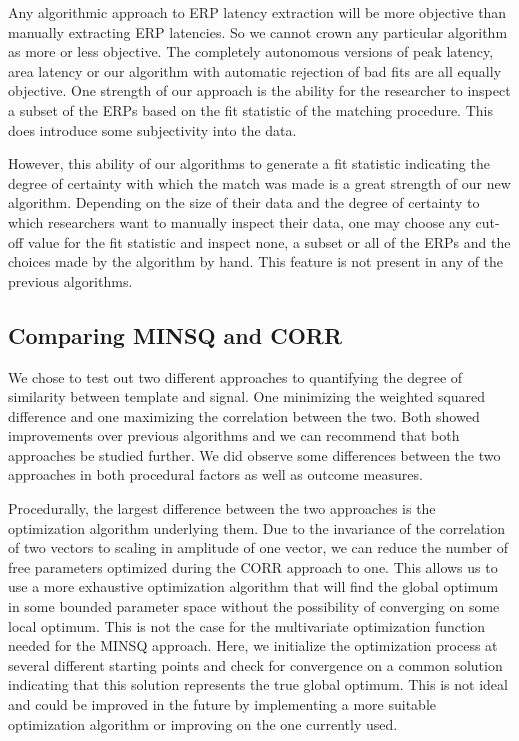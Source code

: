 \documentclass[
  man]{apa7}
\begin{document}
Any algorithmic approach to ERP latency extraction will be more objective than manually extracting ERP latencies. So we cannot crown any particular algorithm as more or less objective. The completely autonomous versions of peak latency, area latency or our algorithm with automatic rejection of bad fits are all equally objective. One strength of our approach is the ability for the researcher to inspect a subset of the ERPs based on the fit statistic of the matching procedure. This does introduce some subjectivity into the data.

However, this ability of our algorithms to generate a fit statistic indicating the degree of certainty with which the match was made is a great strength of our new algorithm. Depending on the size of their data and the degree of certainty to which researchers want to manually inspect their data, one may choose any cut-off value for the fit statistic and inspect none, a subset or all of the ERPs and the choices made by the algorithm by hand. This feature is not present in any of the previous algorithms.

\hypertarget{comparing-minsq-and-corr}{%
\subsection{Comparing MINSQ and CORR}\label{comparing-minsq-and-corr}}

We chose to test out two different approaches to quantifying the degree of similarity between template and signal. One minimizing the weighted squared difference and one maximizing the correlation between the two. Both showed improvements over previous algorithms and we can recommend that both approaches be studied further. We did observe some differences between the two approaches in both procedural factors as well as outcome measures.

Procedurally, the largest difference between the two approaches is the optimization algorithm underlying them. Due to the invariance of the correlation of two vectors to scaling in amplitude of one vector, we can reduce the number of free parameters optimized during the CORR approach to one. This allows us to use a more exhaustive optimization algorithm that will find the global optimum in some bounded parameter space without the possibility of converging on some local optimum. This is not the case for the multivariate optimization function needed for the MINSQ approach. Here, we initialize the optimization process at several different starting points and check for convergence on a common solution indicating that this solution represents the true global optimum. This is not ideal and could be improved in the future by implementing a more suitable optimization algorithm or improving on the one currently used.
\end{document}
